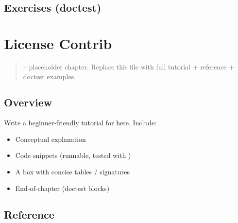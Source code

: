 \documentclass[a4paper,11pt,english]{sphinxmanual}
\begin{document}
\subsection{Exercises (doctest)}
\label{\detokenize{appendices/glossary:exercises-doctest}}
\begin{sphinxVerbatim}[commandchars=\\\{\}]
\end{sphinxVerbatim}

\sphinxstepscope


\section{License Contrib}
\label{\detokenize{appendices/license_contrib:license-contrib}}\label{\detokenize{appendices/license_contrib::doc}}\begin{quote}

\sphinxAtStartPar
{} – placeholder chapter. Replace this file with full tutorial + reference + doctest examples.
\end{quote}


\subsection{Overview}
\label{\detokenize{appendices/license_contrib:overview}}
\sphinxAtStartPar
Write a beginner‑friendly tutorial for  here. Include:
\begin{itemize}
\item {} 
\sphinxAtStartPar
Conceptual explanation

\item {} 
\sphinxAtStartPar
Code snippets (runnable, tested with )

\item {} 
\sphinxAtStartPar
A  box with concise tables / signatures

\item {} 
\sphinxAtStartPar
End‑of‑chapter  (doctest blocks)

\end{itemize}


\subsection{Reference}
\label{\detokenize{appendices/license_contrib:reference}}
\end{document}

